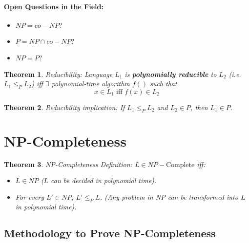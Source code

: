\documentclass[a4paper,12pt]{report}
\newtheorem{theorem}{Theorem}
\begin{document}
\paragraph{Open Questions in the Field: } 
\begin{itemize}
\item $NP = co-NP$?
\item $P=NP\cap co-NP$?
\item $NP = P$?
\end{itemize}


\begin{theorem}{Reducibility: }
Language $L_1$ is \textbf{polynomially reducible} to $L_2$ (i.e. $L_1 \leq_P L_2$) iff $\exists$ polynomial-time algorithm $f()$ such that 
\begin{equation}
x\in L_1 \text{ iff } f(x) \in L_2
\end{equation}
\end{theorem}


\begin{theorem}{Reducibility implication: }
If $L_1 \leq_P L_2$ and $L_2\in P$, then $L_1\in P$.
\end{theorem}


\section{NP-Completeness}

\begin{theorem}{NP-Completeness Definition: }
$L\in NP-\text{Complete}$ iff:
\begin{itemize}
\item $L\in NP$ ($L$ can be decided in polynomial time).
\item For every $L'\in NP$, $L'\leq_P L$. (Any problem in NP can be transformed into $L$ in polynomial time). 
\end{itemize}
\end{theorem}


\subsection{Methodology to Prove NP-Completeness}
\end{document}
